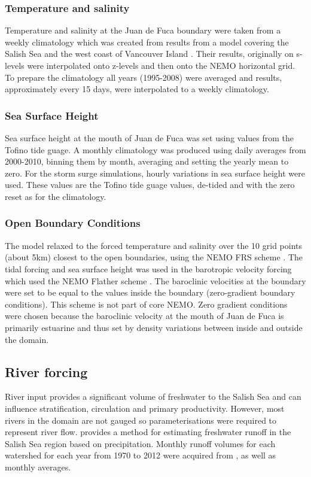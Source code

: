 \documentclass[pdftex,12pt]{article}
\begin{document}
\subsubsection{Temperature and salinity}
Temperature and salinity at the Juan de Fuca boundary were taken from a weekly climatology which was created from results from a model covering the Salish Sea and the west coast of Vancouver Island \citep{massonfine2012}.  Their results, originally on s-levels were interpolated onto z-levels and then onto the NEMO horizontal grid.  To prepare the climatology all years (1995-2008) were averaged and results, approximately every 15 days, were interpolated to a weekly climatology.

\subsubsection{Sea Surface Height}
Sea surface height at the mouth of Juan de Fuca was set using values from the Tofino tide guage.  A monthly climatology was produced using daily averages from 2000-2010, binning them by month, averaging and setting the yearly mean to zero.  For the storm surge simulations, hourly variations in sea surface height were used.  These values are the Tofino tide guage values, de-tided and with the zero reset as for the climatology.

\subsubsection{Open Boundary Conditions}

The model relaxed to the forced temperature and salinity over the 10 grid points (about 5km) closest to the open boundaries, using the NEMO FRS scheme \citep{madec2008nemo}. %
The tidal forcing and sea surface height was used in the barotropic velocity forcing which used the NEMO Flather scheme \citet{madec2008nemo}. %
The baroclinic velocities at the boundary were set to be equal to the values inside the boundary (zero-gradient boundary conditions).  This scheme is not part of core NEMO.  Zero gradient conditions were chosen because the baroclinic velocity at the mouth of Juan de Fuca is primarily estuarine and thus set by density variations between inside and outside the domain.

\subsection{River forcing}
River input provides a significant volume of freshwater to the Salish Sea and can influence stratification, circulation and primary productivity. However, most rivers in the domain are not gauged so parameterisations were required to represent river flow. \citet{morrison2011rivers} provides a method for estimating freshwater runoff in the Salish Sea region based on precipitation. Monthly runoff volumes for each watershed for each year from 1970 to 2012 were acquired from \citet{morrison2011rivers}, as well as monthly averages. 
\end{document}

